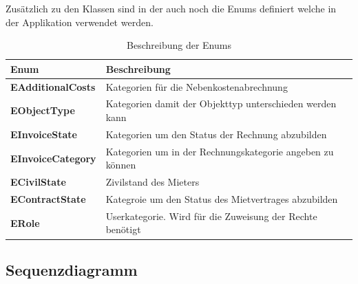 Zusätzlich zu den Klassen sind in der  auch noch die Enums definiert welche in der Applikation verwendet werden.

\begin{table}[H]
  \centering
  \settowidth{}
  \setlength\extrarowheight{2pt}
    \begin{tabulary}{1.0\textwidth}{|L|L|}
      \hline
      \textbf{Enum}& \textbf{Beschreibung}\\
    \hline
    \textbf{EAdditionalCosts} & Kategorien für die Nebenkostenabrechnung\\
    \hline
    \textbf{EObjectType} & Kategorien damit der Objekttyp unterschieden werden kann\\
    \hline
    \textbf{EInvoiceState} & Kategorien um den Status der Rechnung abzubilden\\
    \hline
    \textbf{EInvoiceCategory} & Kategorien um in der Rechnungskategorie angeben zu können\\
    \hline
    \textbf{ECivilState} & Zivilstand des Mieters\\
    \hline
    \textbf{EContractState} & Kategroie um den Status des Mietvertrages abzubilden\\
    \hline
    \textbf{ERole} & Userkategorie. Wird für die Zuweisung der Rechte benötigt\\
    \hline
\end{tabulary}
\caption{Beschreibung der Enums}
\end{table}

\subsection{Sequenzdiagramm}


